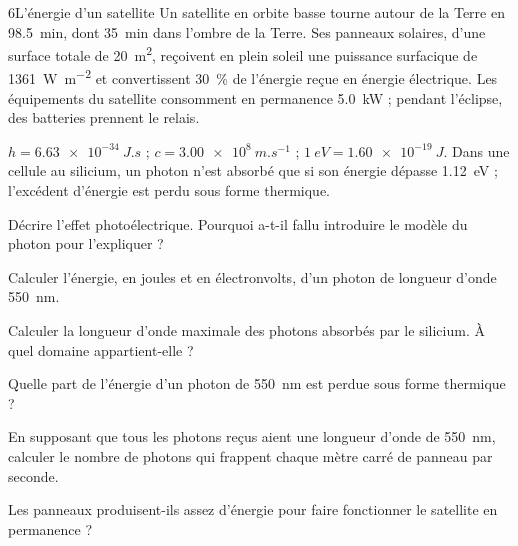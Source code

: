 \begin{exoBac}{6}{L'énergie d'un satellite}
Un satellite en orbite basse tourne autour de la Terre en \qty{98,5}{min}, dont \qty{35}{min} dans l'ombre de la Terre. Ses panneaux solaires,
d'une surface totale de \qty{20}{m^2}, reçoivent en plein soleil une puissance surfacique de \qty{1361}{W.m^{-2}} et convertissent 30~\% de
l'énergie reçue en énergie électrique. Les équipements du satellite consomment en permanence \qty{5,0}{kW} ; pendant
l'éclipse, des batteries prennent le relais.
\begin{donnees}
$h=\qty{6,63e-34}{J.s}$ ; $c=\qty{3,00e8}{m.s^{-1}}$ ; $\qty{1}{eV}=\qty{1,60e-19}{J}$. Dans une cellule au silicium, un photon n'est absorbé que si
son énergie dépasse \qty{1,12}{eV} ; l'excédent d'énergie est perdu sous forme thermique.
\end{donnees}
\begin{questions}
\item Décrire l'effet photoélectrique. Pourquoi a-t-il fallu introduire le modèle du photon pour l'expliquer ?
\item Calculer l'énergie, en joules et en électronvolts, d'un photon de longueur d'onde \qty{550}{nm}.
\item Calculer la longueur d'onde maximale des photons absorbés par le silicium. À quel domaine appartient-elle ?
\item Quelle part de l'énergie d'un photon de \qty{550}{nm} est perdue sous forme thermique ?
\item En supposant que tous les photons reçus aient une longueur d'onde de \qty{550}{nm}, calculer le nombre de photons qui
frappent chaque mètre carré de panneau par seconde.
\item \initiative Les panneaux produisent-ils assez d'énergie pour faire fonctionner le satellite en permanence ?
\end{questions}
\end{exoBac}

